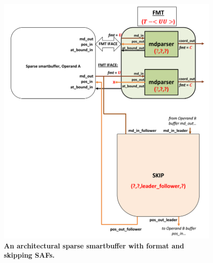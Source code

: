 \begin{figure}[H]
\includegraphics[width=\textwidth]{figures/safinference_build_03fmttopology.png}
\caption{\textbf{An architectural sparse smartbuffer with format and skipping SAFs.}}
\label{fig:safinference_build_03fmttopology}
\centering
\end{figure}



